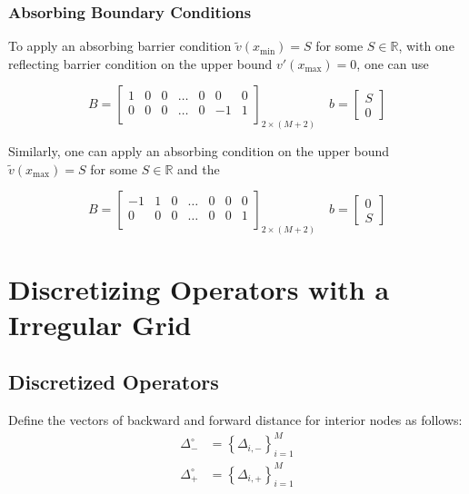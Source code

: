 \documentclass[11pt]{article}
\newcommand{\set}[1]{\ensuremath{\left\{{#1}\right\}}}
\theoremstyle{definition}
\begin{document}
\subsubsection{Absorbing Boundary Conditions}
To apply an absorbing barrier condition $\tilde{v}(x_{\min}) =S$ for some $S \in \mathbb{R}$, with one reflecting barrier condition on the upper bound $v'(x_{\max}) = 0$, one can use

\begin{equation}
B = \begin{bmatrix}
1 & 0 & 0 & \dots & 0 & 0 & 0 \\
0 & 0 & 0 & \dots & 0 & -1 & 1\\
\end{bmatrix}_{2 \times (M+2)} \quad
b = \begin{bmatrix}
S \\
0
\end{bmatrix}
\end{equation}

Similarly, one can apply an absorbing condition on the upper bound  $\tilde{v}(x_{\max}) =S$ for some $S \in \mathbb{R}$ and the


\begin{equation}\label{eq:absorbing-barrier-matrix-ub-regular}
B = \begin{bmatrix}
-1 & 1 & 0 & \dots & 0 & 0 & 0 \\
0 & 0 & 0 & \dots & 0 & 0 & 1\\
\end{bmatrix}_{2 \times (M+2)} \quad
b = \begin{bmatrix}
0 \\
S
\end{bmatrix}
\end{equation}


\section{Discretizing Operators with a Irregular Grid}
\subsection{Discretized Operators}

Define the vectors of backward and forward distance for interior nodes as follows:
\begin{align}
\Delta_{-}^\circ &= \set{\Delta_{i,-}}_{i=1}^M \\
\Delta_{+}^\circ &= \set{\Delta_{i,+}}_{i=1}^M
\end{align}
\end{document}
